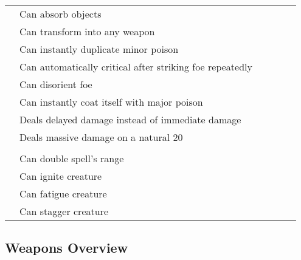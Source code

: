 \begin{longtabuwrapper}
\begin{longtabu}{l X l l l l}
                 & Can absorb objects &  &  \\
                 & Can transform into any weapon &  &  \\
                 & Can instantly duplicate minor poison &  &  \\
                 & Can automatically critical after striking foe repeatedly &  &  \\
                 & Can disorient foe &  &  \\
                 & Can instantly coat itself with major poison &  &  \\
                 & Deals delayed damage instead of immediate damage &  &  \\
                 & Deals massive damage on a natural 20 &  &  \\

                 &  &  &  &  \\
                 & Can double spell's range &  &  \\
                 & Can ignite creature &  &  \\
                 & Can fatigue creature &  &  \\
                 & Can stagger creature &  &  \\
            \end{longtabu}
        \end{longtabuwrapper}
        \twocolumn

    \subsection{Weapons Overview}


